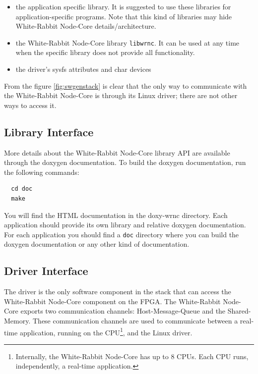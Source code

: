 \documentclass[a4paper,10pt]{article}
\begin{document}
\begin{itemize}
  \item the application specific library. It is suggested to use these
    libraries for application-specific programs. Note that this kind of
    libraries may hide White-Rabbit Node-Core details/architecture.
  \item the White-Rabbit Node-Core library \texttt{libwrnc}. It can be
    used at any time when the specific library does not provide all
    functionality.
  \item the driver's sysfs attributes and char devices
\end{itemize}

From the figure \ref{fig:swgenstack} is clear that the only way to
communicate with the White-Rabbit Node-Core is through its Linux
driver; there are not other ways to access it.


\subsection{Library Interface}%
More details about the White-Rabbit Node-Core library API are
available through the doxygen documentation. To build the doxygen
documentation, run the following commands:

\begin{verbatim}
  cd doc
  make
\end{verbatim}

You will find the HTML documentation in the doxy-wrnc directory. Each
application should provide its own library and relative doxygen
documentation. For each application you should find a \texttt{doc}
directory where you can build the doxygen documentation or any other
kind of documentation.


\subsection{Driver Interface}%
The driver is the only software component in the stack that can access
the White-Rabbit Node-Core component on the FPGA. The White-Rabbit
Node-Core exports two communication channels: Host-Message-Queue and
the Shared-Memory. These communication channels are used to communicate
between a real-time application, running on the
CPU\footnote{Internally, the White-Rabbit Node-Core has up to 8 CPUs.
Each CPU runs, independently, a real-time application.}, and the Linux
driver.
\end{document}
